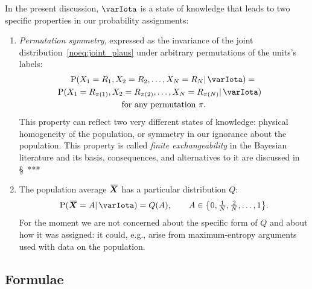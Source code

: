 \documentclass{article}
\theoremstyle{remark}
\theoremstyle{innote}
\newcommand*{\citep}{\parencites}
\renewcommand*{\|}{\mathpunct{|}}%
\DeclarePairedDelimiter\set{\{}{\}}
\newcommand*{\p}{\mathrm{P}}%
\newcommand*{\sect}{\S}%
\newcommand*{\eg}{{e.g.}}
\theoremstyle{simple}
\newcommand*{\widebar}[1]{{\mkern1.5mu\skew{2}\overline{\mkern-1.5mu#1\mkern-1.5mu}\mkern 1.5mu}}
\newcommand*{\av}{\widebar} %
\newcommand*{\yX}{\bm{X}}%
\newcommand*{\yXf}{\av{\yX}}%
\newcommand*{\yH}{\varIota}
\begin{document}
In the present discussion, $\yH$ is a state of knowledge that leads to two
specific properties in our probability assignments:

\medskip
\begin{enumerate}%
\item \emph{Permutation symmetry}, expressed as the invariance of the
  joint distribution~\eqref{noeq:joint_plaus} under arbitrary permutations of
  the units's labels:
\begin{multline}
  \label{noeq:homog_math}
  \p(X_1=R_1, X_2=R_2, \dotsc, X_N=R_N \| \yH) ={}
\\ 
\shoveright{\p(X_1=R_{\pi(1)}, X_2=R_{\pi(2)}, \dotsc, X_N=R_{\pi(N)} \| \yH)}
\\
\text{for any permutation $\pi$}.
\end{multline}
This property can reflect two very different states of knowledge: physical
homogeneity of the population, or symmetry in our ignorance about the population.
This property is called \emph{finite exchangeability} in the Bayesian
literature and its basis, consequences, and alternatives to it are discussed
in \sect~***%

\medskip

\item The population average $\yXf$ has a particular distribution $Q$:
\begin{equation}
  \label{noeq:pop_average_Q}
  \p(\yXf = A \| \yH)
=  Q(A),
\qquad
A \in \set*{0,\tfrac{1}{N},\tfrac{2}{N},\dotsc,1}.
\end{equation}
For the moment we are not concerned about the specific form of $Q$ and
about how it was assigned: it could, \eg, arise from maximum-entropy
arguments
\citep[\eg:][]{jaynes1957,jaynes1963,good1963,jaynes1967,aczeletal1975,jaynes1979b,vancampenhoutetal1981,sivia1990,fangetal1997,bretthorst2013}
used with data on the population.
\end{enumerate}

\subsection{Formulae}
\label{nosec:main_formulae}
\end{document}
